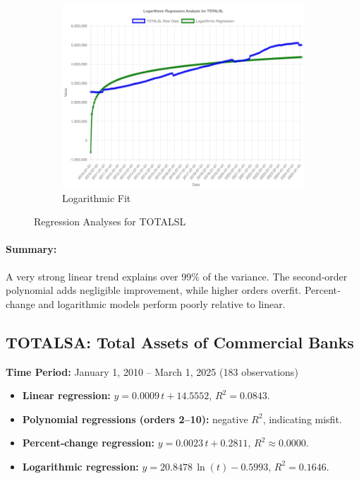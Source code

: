 \documentclass[11pt,a4paper]{article}
\begin{document}
\begin{figure}[htbp]
\begin{subfigure}[b]{0.32\textwidth}
    \includegraphics[width=\textwidth]{backend/analyses/TOTALSL_log_analysis.png}
    \caption{Logarithmic Fit}
  \end{subfigure}
  \caption{Regression Analyses for TOTALSL}
\end{figure}

\paragraph{Summary:}
A very strong linear trend explains over 99\% of the variance. The second‐order polynomial adds negligible improvement, while higher orders overfit. Percent‐change and logarithmic models perform poorly relative to linear.

\clearpage
\subsection{TOTALSA: Total Assets of Commercial Banks}
\textbf{Time Period:} January 1, 2010 – March 1, 2025 (183 observations)

\begin{itemize}
  \item \textbf{Linear regression:} \(y = 0.0009\,t + 14.5552\), \(R^2 = 0.0843\).
  \item \textbf{Polynomial regressions (orders 2–10):} negative \(R^2\), indicating misfit.
  \item \textbf{Percent‐change regression:} \(y = 0.0023\,t + 0.2811\), \(R^2 \approx 0.0000\).
  \item \textbf{Logarithmic regression:} \(y = 20.8478\,\ln(t) - 0.5993\), \(R^2 = 0.1646\).
\end{itemize}
\end{document}
